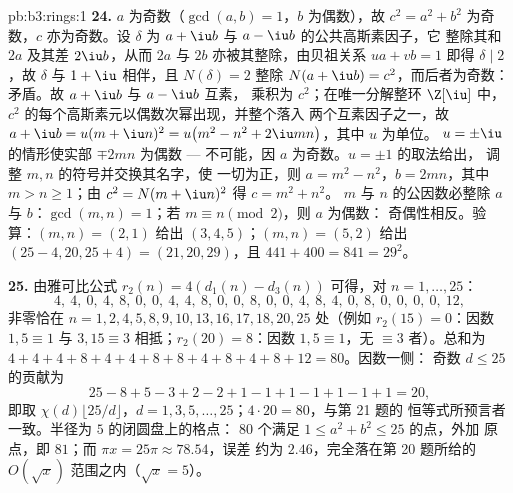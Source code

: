 \begin{solution}{pb:b3:rings:1}
\textbf{24.} $a$ 为奇数（$\gcd(a, b) = 1$，$b$ 为偶数），故 $c^2
= a^2 + b^2$ 为奇数，$c$ 亦为奇数。设 $\delta$ 为
$a + \iu b$ 与 $a - \iu b$ 的公共高斯素因子，它
整除其和 $2a$ 及其差 $2\iu b$，从而
$2a$ 与 $2b$ 亦被其整除，由贝祖关系 $ua + vb = 1$ 即得
$\delta \mid 2$，故 $\delta$ 与 $1 + \iu$ 相伴，且
$N(\delta) = 2$ 整除 $N(a + \iu b) = c^2$，而后者为奇数：
矛盾。故 $a + \iu b$ 与 $a - \iu b$ 互素，
乘积为 $c^2$；在唯一分解整环 $\Z[\iu]$ 中，
$c^2$ 的每个高斯素元以偶数次幂出现，并整个落入
两个互素因子之一，故 $a + \iu b = u(m + \iu
n)^2 = u\bigl(m^2 - n^2 + 2\iu mn\bigr)$，其中 $u$ 为单位。
$u = \pm\iu$ 的情形使实部 $\mp 2mn$ 为偶数 ---
不可能，因 $a$ 为奇数。$u = \pm1$ 的取法给出，
调整 $m, n$ 的符号并交换其名字，使
一切为正，则 $a = m^2 - n^2$，$b = 2mn$，其中 $m > n
\geq 1$；由 $c^2 = N(m + \iu n)^2$ 得 $c = m^2 + n^2$。
$m$ 与 $n$ 的公因数必整除 $a$ 与 $b$：$\gcd
(m, n) = 1$；若 $m \equiv n \pmod 2$，则 $a$ 为偶数：
奇偶性相反。验算：$(m, n) = (2, 1)$ 给出 $(3, 4,
5)$；$(m, n) = (5, 2)$ 给出 $(25 - 4, 20, 25 + 4) = (21, 20,
29)$，且 $441 + 400 = 841 = 29^2$。

\textbf{25.} 由雅可比公式 $r_2(n) = 4(d_1(n) - d_3(n))$
可得，对 $n = 1, \dots, 25$：
\[
4,\ 4,\ 0,\ 4,\ 8,\ 0,\ 0,\ 4,\ 4,\ 8,\ 0,\ 0,\ 8,\ 0,\ 0,\
4,\ 8,\ 4,\ 0,\ 8,\ 0,\ 0,\ 0,\ 0,\ 12,
\]
非零恰在 $n = 1, 2, 4, 5, 8, 9, 10, 13, 16, 17, 18,
20, 25$ 处（例如 $r_2(15) = 0$：因数 $1, 5 \equiv 1$
与 $3, 15 \equiv 3$ 相抵；$r_2(20) = 8$：因数 $1, 5
\equiv 1$，无 $\equiv 3$ 者）。总和为 $4 + 4 + 4 + 8 + 4 +
4 + 8 + 8 + 4 + 8 + 4 + 8 + 12 = 80$。因数一侧：
奇数 $d \leq 25$ 的贡献为
\[
25 - 8 + 5 - 3 + 2 - 2 + 1 - 1 + 1 - 1 + 1 - 1 + 1 = 20,
\]
即取 $\chi(d)\lfloor 25/d\rfloor$，$d = 1, 3, 5, \dots,
25$；$4 \cdot 20 = 80$，与第 21 题的
恒等式所预言者一致。半径为 $5$ 的闭圆盘上的格点：
$80$ 个满足 $1 \leq a^2 + b^2 \leq 25$ 的点，外加
原点，即 $81$；而 $\pi x = 25\pi \approx 78.54$，误差
约为 $2.46$，完全落在第 20 题所给的 $O(\sqrt x)$
范围之内（$\sqrt x = 5$）。
\end{solution}
